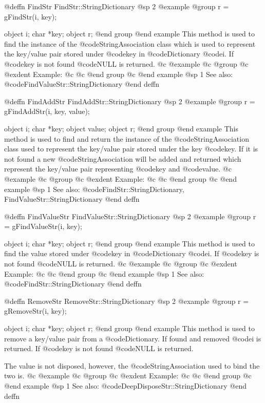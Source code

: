 @deffn {FindStr} FindStr::StringDictionary
@sp 2
@example
@group
r = gFindStr(i, key);

object  i;
char    *key;
object  r;
@end group
@end example
This method is used to find the instance of the @code{StringAssociation}
class which is used to represent the key/value pair stored under
@code{key} in @code{Dictionary} @code{i}.  If @code{key} is not found
@code{NULL} is returned.
@c @example
@c @group
@c @exdent Example:
@c 
@c @end group
@c @end example
@sp 1
See also:  @code{FindValueStr::StringDictionary}
@end deffn










@deffn {FindAddStr} FindAddStr::StringDictionary
@sp 2
@example
@group
r = gFindAddStr(i, key, value);

object  i;
char    *key;
object  value;
object  r;
@end group
@end example
This method is used to find and return the instance of the
@code{StringAssociation} class used to represent the key/value pair
stored under the key @code{key}.  If it is not found a new
@code{StringAssociation} will be added and returned which represent the
key/value pair representing @code{key} and @code{value}.
@c @example
@c @group
@c @exdent Example:
@c 
@c @end group
@c @end example
@sp 1
See also:  @code{FindStr::StringDictionary, FindValueStr::StringDictionary}
@end deffn









@deffn {FindValueStr} FindValueStr::StringDictionary
@sp 2
@example
@group
r = gFindValueStr(i, key);

object  i;
char    *key;
object  r;
@end group
@end example
This method is used to find the value stored under @code{key} in
@code{Dictionary} @code{i}.  If @code{key} is not found @code{NULL} is
returned.
@c @example
@c @group
@c @exdent Example:
@c 
@c @end group
@c @end example
@sp 1
See also:  @code{FindStr::StringDictionary}
@end deffn











@deffn {RemoveStr} RemoveStr::StringDictionary
@sp 2
@example
@group
r = gRemoveStr(i, key);

object  i;
char    *key;
object  r;
@end group
@end example
This method is used to remove a key/value pair from a @code{Dictionary}.
If found and removed @code{i} is returned.  If @code{key} is not found
@code{NULL} is returned.

The value is not disposed, however, the @code{StringAssociation} used to
bind the two is.
@c @example
@c @group
@c @exdent Example:
@c 
@c @end group
@c @end example
@sp 1
See also:  @code{DeepDisposeStr::StringDictionary}
@end deffn







